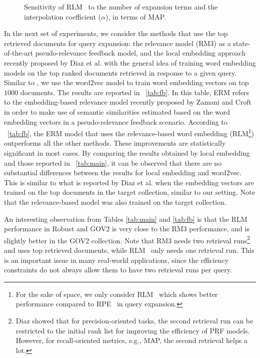 \documentclass[sigconf]{acmart}
\begin{document}
\begin{figure*}[t]
\centering
\vspace{-0.35cm}
\begin{minipage}{.32\linewidth}
\centering
{}
\end{minipage}\begin{minipage}{.32\linewidth}
\centering
{}
\end{minipage}
\caption{Sensitivity of {RLM~} to the number of expansion terms and the interpolation coefficient ($\alpha$), in terms of MAP.}
\label{fig:param_sens} 
\end{figure*} 

In the next set of experiments, we consider the methods that use the top retrieved documents for query expansion: the relevance model (RM3) \cite{Abdul-jaleel:2004,Lavrenko:2001} as a state-of-the-art pseudo-relevance feedback model, and the local embedding approach recently proposed by Diaz et al. \cite{Diaz:2016} with the general idea of training word embedding models on the top ranked documents retrieved in response to a given query. Similar to \cite{Diaz:2016}, we use the word2vec model to train word embedding vectors on top $1000$ documents. The results are reported in \tablename~\ref{tab:fb}. In this table, ERM refers to the embedding-based relevance model recently proposed by Zamani and Croft \cite{Zamani:2016:ICTIR:emb} in order to make use of semantic similarities estimated based on the word embedding vectors in a pseudo-relevance feedback scenario. According to \tablename~\ref{tab:fb}, the ERM model that uses the relevance-based word embedding (RLM\footnote{For the sake of space, we only consider {RLM~} which shows better performance compared to {RPE~} in query expansion.}) outperforms all the other methods. These improvements are statistically significant in most cases. By comparing the results obtained by local embedding and those reported in \tablename~\ref{tab:main}, it can be observed that there are no substantial differences between the results for local embedding and word2vec. This is similar to what is reported by Diaz et al. \cite{Diaz:2016} when the embedding vectors are trained on the top documents in the target collection, similar to our setting. Note that the relevance-based model was also trained on the target collection. 

An interesting observation from Tables \ref{tab:main} and \ref{tab:fb} is that the {RLM~} performance in Robust and GOV2 is very close to the RM3 performance, and is slightly better in the GOV2 collection. Note that RM3 needs two retrieval runs\footnote{Diaz \cite{Diaz:2015} showed that for precision-oriented tasks, the second retrieval run can be restricted to the initial rank list for improving the efficiency of PRF models. However, for recall-oriented metrics, e.g., MAP, the second retrieval helps a lot.} and uses top retrieved documents, while {RLM~} only needs one retrieval run. This is an important issue in many real-world applications, since the efficiency constraints do not always allow them to have two retrieval runs per query.
\end{document}
